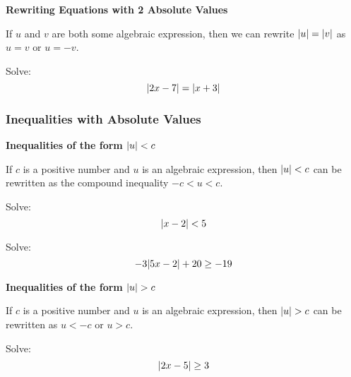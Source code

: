 \begin{mdframed}
\textbf{Rewriting Equations with 2 Absolute Values}

If $u$ and $v$ are both some algebraic expression, then we can rewrite $\abs{u} = \abs{v}$ as $u = v \text{ or } u = -v$.
\end{mdframed}

\vspace{.2in}

\begin{example}
Solve: \[ \abs{2x-7} = \abs{x+3}\]
\vspace{2in}
\end{example}

\subsubsection*{Inequalities with Absolute Values}

\begin{mdframed}
\textbf{Inequalities of the form $\abs{u} < c$}

If $c$ is a positive number and $u$ is an algebraic expression, then $\abs{u} < c$ can be rewritten as the compound inequality $-c < u < c$.
\end{mdframed}

\begin{example}
Solve: \[ \abs{x-2} < 5\]
\vspace{1.5in}
\end{example}

\newpage

\begin{example}
Solve: \[-3\abs{5x-2} + 20 \ge -19\]
\vspace{2in}
\end{example}

\begin{mdframed}
\textbf{Inequalities of the form $\abs{u} > c$}

If $c$ is a positive number and $u$ is an algebraic expression, then $\abs{u} > c$ can be rewritten as $u < -c \text{ or } u > c$.
\end{mdframed}

\vspace{.2in}

\begin{example}
Solve: \[\abs{2x-5}\ge 3\]
\vspace{1.5in}
\end{example}